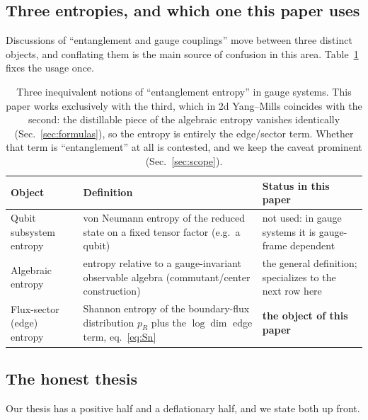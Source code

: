 \documentclass[11pt]{article}
\theoremstyle{remark}
\theoremstyle{plain}
\begin{document}
\subsection{Three entropies, and which one this paper uses}\label{sec:threeentropies}

Discussions of ``entanglement and gauge couplings'' move between three distinct objects, and conflating them is the main source of confusion in this area. Table~\ref{tab:notation} fixes the usage once.

\begin{table}[t]
\centering
\small
\begin{tabular}{p{}p{}p{}}
\toprule
\textbf{Object} & \textbf{Definition} & \textbf{Status in this paper} \\
\midrule
Qubit subsystem entropy & von Neumann entropy of the reduced state on a fixed tensor factor (e.g.\ a qubit) & not used: in gauge systems it is gauge-frame dependent \cite{P1} \\[3pt]
Algebraic entropy & entropy relative to a gauge-invariant observable algebra (commutant/center construction) \cite{BKOV, Zanardi, CHR} & the general definition; specializes to the next row here \\[3pt]
Flux-sector (edge) entropy & Shannon entropy of the boundary-flux distribution $p_R$ plus the $\log\dim$ edge term, eq.~\eqref{eq:Sn} & \textbf{the object of this paper} \\
\bottomrule
\end{tabular}
\caption{Three inequivalent notions of ``entanglement entropy'' in gauge systems. This paper works exclusively with the third, which in 2d Yang--Mills coincides with the second: the distillable piece of the algebraic entropy vanishes identically (Sec.~\ref{sec:formulas}), so the entropy is entirely the edge/sector term. Whether that term is ``entanglement'' at all is contested, and we keep the caveat prominent (Sec.~\ref{sec:scope}).}
\label{tab:notation}
\end{table}

\subsection{The honest thesis}

Our thesis has a positive half and a deflationary half, and we state both up front.
\end{document}
